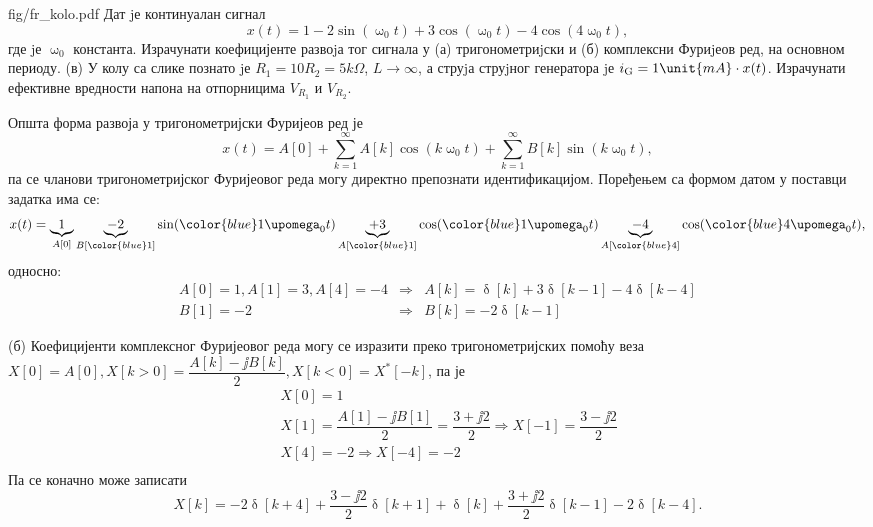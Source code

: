 \begin{slikaDesno}{fig/fr_kolo.pdf}
    \PID
    Дат jе континуалан сигнал 
    $$ 
    x(t) = 1 - 2 \sin(\upomega_0 t) + 3 \cos(\upomega_0 t) 
    - 4 \cos(4 \upomega_0 t),$$ где jе $\upomega_0$ константа. 
    Израчунати коефицијенте развоjа тог сигнала у (а) тригонометриjски и (б) комплексни Фуриjеов ред, 
    на основном периоду. (в) У колу са слике познато jе $R_1 = 10R_2 = 5\unit{k\Omega}$, $L \to \infty$, 
    а струjа струjног генератора jе $i_{\rm G} = 1 \unit{mA} \cdot x(t)$. Израчунати ефективне вредности напона на отпорницима 
    $V_{R_1}$ и $V_{R_2}$.
\end{slikaDesno}

\RESENJE

Општа форма развоја у тригонометријски Фуријеов ред је 
\begin{equation}
    x(t) = A[0] + \sum_{k = 1}^{\infty} A[k] \cos(k\upomega_0 t) + \sum_{k = 1}^{\infty} B[k] \sin(k\upomega_0 t),
    \label{eq:trig_ctfs}
\end{equation}
па се чланови тригонометријског Фуријеовог реда могу директно препознати идентификацијом. Поређењем са формом датом у поставци задатка има се:
\begin{eqnarray}
    x(t) = 
    \underbrace{1}_{A[0]} 
    \underbrace{-2}_{B[{\color{blue}1}]} \sin({\color{blue} 1} \upomega_0 t) 
    \underbrace{+3}_{A[{\color{blue}1}]} \cos({\color{blue} 1} \upomega_0 t) 
    \underbrace{-4}_{A[{\color{blue}4}]} \cos({\color{blue} 4} \upomega_0 t),
\end{eqnarray}
односно: 
\begin{eqnarray}
    A[0] = 1, A[1] = 3, A[4] = -4 &\Rightarrow& A[k] = \updelta[k] + 3\updelta[k-1] - 4\updelta[k-4]\\
              B[1] = -2           &\Rightarrow& B[k] = -2\updelta[k-1]
\end{eqnarray}

(б) Коефицијенти комплексног Фуријеовог реда могу се изразити преко тригонометријских помоћу веза
$X[0] = A[0], X[k > 0] = \dfrac{A[k] - \jj B[k]}{2}, X[k < 0] = X^\ast[-k]$, па је 
\begin{eqnarray}
    && X[0] = 1 \\ 
    && X[1] = \dfrac{A[1] - \jj B[1]}{2} = \dfrac{3 + \jj 2}{2} \Rightarrow  X[-1] = \dfrac{3 - \jj 2}{2}  \\
    && X[4] = -2 \Rightarrow X[-4] = -2 \\
\end{eqnarray}
Па се коначно може записати 
\begin{equation}
    X[k] = - 2\updelta[k + 4] + \dfrac{3 - \jj 2}{2}\updelta[k+1] 
    + \updelta[k] 
    + \dfrac{3 + \jj 2}{2}\updelta[k-1] 
    - 2\updelta[k - 4].
\end{equation}


